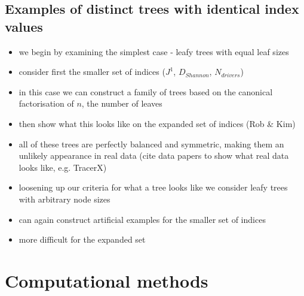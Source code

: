 \subsection{Examples of distinct trees with identical index values}
\begin{itemize}
    \item we begin by examining the simplest case - leafy trees with equal leaf sizes
    \item consider first the smaller set of indices ($J^1$, $D_{Shannon}$, $N_{drivers}$)
    \item in this case we can construct a family of trees based on the canonical factorisation of $n$, the number of leaves
    \item then show what this looks like on the expanded set of indices (Rob \& Kim)
    \item all of these trees are perfectly balanced and symmetric, making them an unlikely appearance in real data (cite data papers to show what real data looks like, e.g. TracerX)
    \item loosening up our criteria for what a tree looks like we consider leafy trees with arbitrary node sizes
    \item can again construct artificial examples for the smaller set of indices
    \item more difficult for the expanded set
\end{itemize}

\section{Computational methods}
